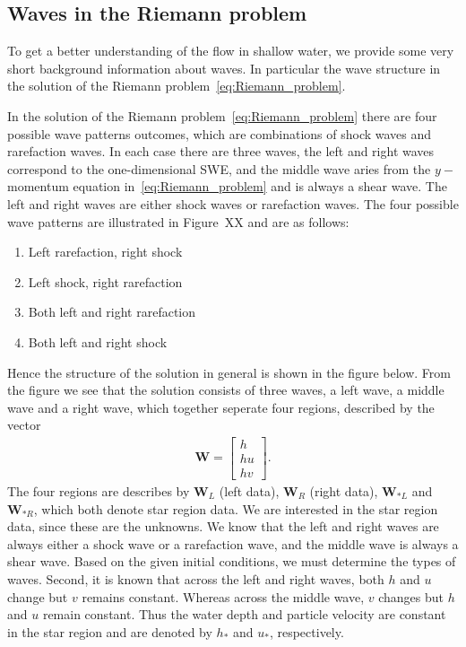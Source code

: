 \subsection{Waves in the Riemann problem}
To get a better understanding of the flow in shallow water, we provide some very short background information about waves.
In particular the wave structure in the solution of the Riemann problem~\eqref{eq:Riemann_problem}.

In the solution of the Riemann problem~\eqref{eq:Riemann_problem} there are four possible wave patterns outcomes, which are combinations of shock waves and rarefaction waves.
In each case there are three waves, the left and right waves correspond to the one-dimensional SWE, and the middle wave aries from the $y-$momentum equation in~\eqref{eq:Riemann_problem} and is always a shear wave.
The left and right waves are either shock waves or rarefaction waves.
The four possible wave patterns are illustrated in Figure~XX and are as follows:
\begin{enumerate}
    \item Left rarefaction, right shock
    \item Left shock, right rarefaction
    \item Both left and right rarefaction
    \item Both left and right shock
\end{enumerate}
Hence the structure of the solution in general is shown in the figure below.
From the figure we see that the solution consists of three waves, a left wave, a middle wave and a right wave, which together seperate four regions, described by the vector
\begin{align*}
\mathbf{W} = \begin{bmatrix}
    h \\ hu \\ hv
    \end{bmatrix}.
\end{align*}
The four regions are describes by $\mathbf{W}_L$ (left data), $\mathbf{W}_R$ (right data), $\mathbf{W}_{*L}$ and $\mathbf{W}_{*R}$, which both denote star region data.
We are interested in the star region data, since these are the unknowns.
We know that the left and right waves are always either a shock wave or a rarefaction wave, and the middle wave is always a shear wave.
Based on the given initial conditions, we must determine the types of waves.
Second, it is known that across the left and right waves, both $h$ and $u$ change but $v$ remains constant.
Whereas across the middle wave, $v$ changes but $h$ and $u$ remain constant.
Thus the water depth and particle velocity are constant in the star region and are denoted by $h_*$ and $u_*$, respectively.


